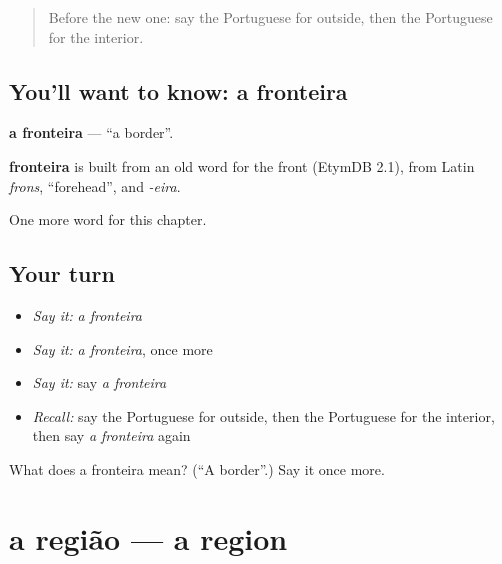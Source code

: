 \label{lesson:PT-C213-fronteira}



\begin{quote}
Before the new one: say the Portuguese for outside, then the Portuguese for the interior.
\end{quote}

\subsection*{You'll want to know: a fronteira}
\textbf{a fronteira} — \textquotedblleft{}a border\textquotedblright{}.

\begin{cousinweb}
\textbf{fronteira} is built from an old word for the front (EtymDB 2.1), from Latin \emph{frons}, \textquotedblleft{}forehead\textquotedblright{}, and \emph{-eira}.
\end{cousinweb}

\begin{grammarlens}[title={What you've built}]
One more word for this chapter.
\end{grammarlens}

\subsection*{Your turn}
\begin{itemize}
\raggedright
  \item \emph{Say it:} \emph{a fronteira}
  \item \emph{Say it:} \emph{a fronteira}, once more
  \item \emph{Say it:} say \emph{a fronteira}
  \item \emph{Recall:} say the Portuguese for outside, then the Portuguese for the interior, then say \emph{a fronteira} again
\end{itemize}

\begin{tcolorbox}[breakable,colback=teal!4,colframe=teal!35!black,title={Before you move on}]
What does a fronteira mean? (\textquotedblleft{}A border\textquotedblright{}.) Say it once more.
\end{tcolorbox}
\section[a região]{a região — a region}

\label{lesson:PT-C213-regiao}



